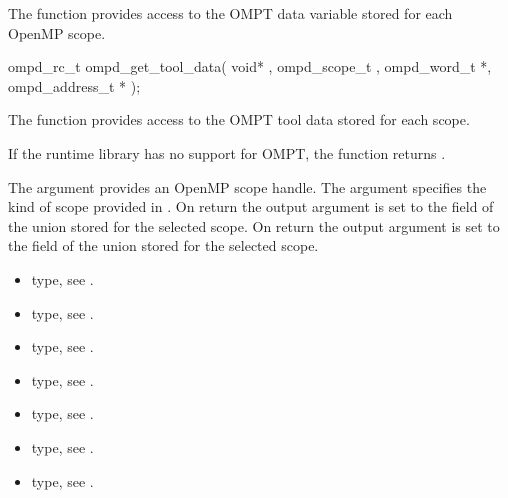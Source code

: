 \label{subsubsubsec:ompd_get_tool_data}
\summary
The  function provides access to the OMPT data variable 
stored for each OpenMP scope.

\format

\begin{cspecific}
\begin{ompSyntax}
ompd_rc_t ompd_get_tool_data(
  void* , 
  ompd_scope_t ,
  ompd_word_t *,
  ompd_address_t *
);
\end{ompSyntax}
\end{cspecific}

\descr
The function  provides access to the OMPT tool data
stored for each scope.

If the runtime library has no support for OMPT, the function returns 
.


\argdesc
The argument  provides an OpenMP scope handle.
The argument  specifies the kind of scope provided in .
On return the output argument  is set to the  field of the 
 union stored for the selected scope.
On return the output argument  is set to the   field of the 
 union stored for the selected scope.


\crossreferences
\begin{itemize}
	\item {} type, see 
        .
    \item {} type, see .
    \item {} type, see 
        .
    \item {} type, see .
    \item {} type, see .
    \item {} type, see .
    \item {} type, see .
\end{itemize}

